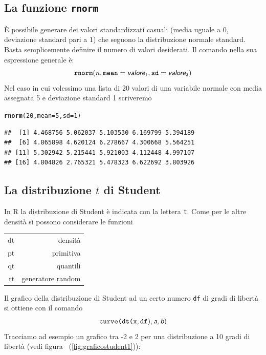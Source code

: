 \documentclass[onecolumn,12pt]{book}\usepackage[]{graphicx}\usepackage[]{color}
\makeatletter
\newcommand{\hlnum}[1]{\textcolor[rgb]{0.686,0.059,0.569}{#1}}%
\newcommand{\hlstd}[1]{\textcolor[rgb]{0.345,0.345,0.345}{#1}}%
\newcommand{\hlkwc}[1]{\textcolor[rgb]{0.333,0.667,0.333}{#1}}%
\newcommand{\hlkwd}[1]{\textcolor[rgb]{0.737,0.353,0.396}{\textbf{#1}}}%
\newenvironment{kframe}{%
 \def\at@end@of@kframe{}%
 \ifinner\ifhmode%
  \def\at@end@of@kframe{\end{minipage}}%
  \begin{minipage}{\columnwidth}%
 \fi\fi%
 \def\FrameCommand##1{\hskip\@totalleftmargin \hskip-\fboxsep
 \colorbox{shadecolor}{##1}\hskip-\fboxsep
     \hskip-\linewidth \hskip-\@totalleftmargin \hskip\columnwidth}%
 \MakeFramed {\advance\hsize-\width
   \@totalleftmargin\z@ \linewidth\hsize
   \@setminipage}}%
 {\par\unskip\endMakeFramed%
 \at@end@of@kframe}
\newenvironment{knitrout}{}{} %
\newcommand{\varia}[1]{\textsl{\textsf{#1}}}
\makeatother
\begin{document}
 \subsection{La funzione \texttt{rnorm}}
\`E possibile generare dei valori standardizzati casuali (media uguale a 0, deviazione standard pari a 1) che seguono la distribuzione normale standard. Basta semplicemente definire il numero di valori desiderati.
Il comando nella sua espressione generale \`e:
\begin{equation}\texttt{rnorm}(n,\texttt{mean}=\varia{valore}_1,\texttt{sd}=\varia{valore}_2)\end{equation}
Nel caso in cui volessimo una lista di 20 valori di una variabile normale con media assegnata 5 e deviazione standard 1 scriveremo
\begin{knitrout}
\color{fgcolor}\begin{kframe}
\begin{alltt}
\hlkwd{rnorm}\hlstd{(}\hlnum{20}\hlstd{,}\hlkwc{mean}\hlstd{=}\hlnum{5}\hlstd{,}\hlkwc{sd}\hlstd{=}\hlnum{1}\hlstd{)}
\end{alltt}
\begin{verbatim}
##  [1] 4.468756 5.062037 5.103530 6.169799 5.394189
##  [6] 4.865898 4.620124 6.278667 4.300668 5.564251
## [11] 5.302942 5.215441 5.921003 4.112448 4.997107
## [16] 4.804826 2.765321 5.478323 6.622692 3.803926
\end{verbatim}
\end{kframe}
\end{knitrout}
\subsection{La distribuzione $t$ di Student}
In \textsf{R} la distribuzione di Student \`e indicata con la lettera  \texttt{t}.  Come per le altre densit\`a  si possono considerare le funzioni\vskip5pt
\begin{tabular}{|r|r |}
\hline
dt  &densit\`a\\
pt  &primitiva\\
qt & quantili\\
rt  &generatore random\\
\hline
\end{tabular}
\vskip10pt
Il grafico della distribuzione di Student ad un certo numero \texttt{df} di gradi di libert\`a  si ottiene con il comando
\begin{equation*}
\texttt{curve(dt(x},\texttt{df}),\varia{a},\varia{b})
\end{equation*}
Tracciamo ad esempio un grafico tra -2 e 2 per una distribuzione a 10 gradi di libert\`a (vedi figura ~(\ref{fig:graficostudent1})):
\end{document}
